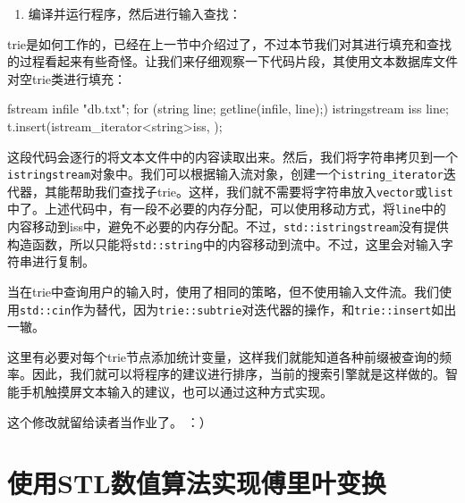 \begin{enumerate}
\item 编译并运行程序，然后进行输入查找：



\end{enumerate}

trie是如何工作的，已经在上一节中介绍过了，不过本节我们对其进行填充和查找的过程看起来有些奇怪。让我们来仔细观察一下代码片段，其使用文本数据库文件对空trie类进行填充：

\begin{codebox}[cpp]
fstream infile {"db.txt"};
for (string line; getline(infile, line);) {
    istringstream iss {line};
    t.insert(istream_iterator<string>{iss}, {});
}
\end{codebox}

这段代码会逐行的将文本文件中的内容读取出来。然后，我们将字符串拷贝到一个\texttt{istringstream}对象中。我们可以根据输入流对象，创建一个\texttt{istring\_iterator}迭代器，其能帮助我们查找子trie。这样，我们就不需要将字符串放入\texttt{vector}或\texttt{list}中了。上述代码中，有一段不必要的内存分配，可以使用移动方式，将\texttt{line}中的内容移动到iss中，避免不必要的内存分配。不过，\texttt{std::istringstream}没有提供构造函数，所以只能将\texttt{std::string}中的内容移动到流中。不过，这里会对输入字符串进行复制。

当在trie中查询用户的输入时，使用了相同的策略，但不使用输入文件流。我们使用\texttt{std::cin}作为替代，因为\texttt{trie::subtrie}对迭代器的操作，和\texttt{trie::insert}如出一辙。


这里有必要对每个trie节点添加统计变量，这样我们就能知道各种前缀被查询的频率。因此，我们就可以将程序的建议进行排序，当前的搜索引擎就是这样做的。智能手机触摸屏文本输入的建议，也可以通过这种方式实现。

这个修改就留给读者当作业了。 ：）


\section{使用STL数值算法实现傅里叶变换}

